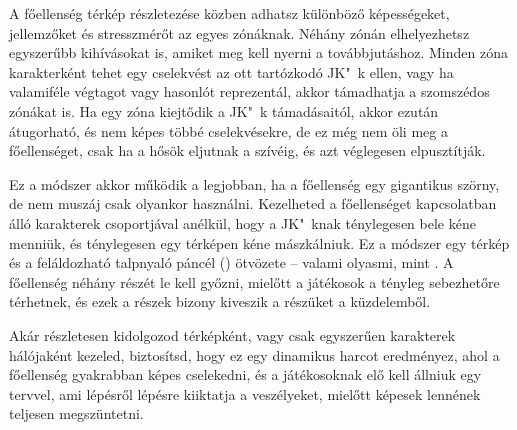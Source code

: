 A főellenség térkép részletezése közben adhatsz különböző képességeket, jellemzőket és stresszmérőt az egyes zónáknak. Néhány zónán elhelyezhetsz egyszerűbb kihívásokat is, amiket meg kell nyerni a továbbjutáshoz. Minden zóna karakterként tehet egy cselekvést az ott tartózkodó JK"~k ellen, vagy ha valamiféle végtagot vagy hasonlót reprezentál, akkor támadhatja a szomszédos zónákat is. Ha egy zóna kiejtődik a JK"~k támadásaitól, akkor ezután átugorható, és nem képes többé cselekvésekre, de ez még nem öli meg a főellenséget, csak ha a hősök eljutnak a szívéig, és azt véglegesen elpusztítják.

Ez a módszer akkor működik a legjobban, ha a főellenség egy gigantikus szörny, de nem muszáj csak olyankor használni. Kezelheted a főellenséget kapcsolatban álló karakterek csoportjával anélkül, hogy a JK"~knak ténylegesen bele kéne menniük, és ténylegesen egy térképen kéne mászkálniuk. Ez a módszer egy térkép és a feláldozható talpnyaló páncél () ötvözete -- valami olyasmi, mint . A főellenség néhány részét le kell győzni, mielőtt a játékosok a tényleg sebezhetőre térhetnek, és ezek a részek bizony kiveszik a részüket a küzdelemből.

Akár részletesen kidolgozod térképként, vagy csak egyszerűen karakterek hálójaként kezeled, biztosítsd, hogy ez egy dinamikus harcot eredményez, ahol a főellenség gyakrabban képes cselekedni, és a játékosoknak elő kell állniuk egy tervvel, ami lépésről lépésre kiiktatja a veszélyeket, mielőtt képesek lennének teljesen megszüntetni.
